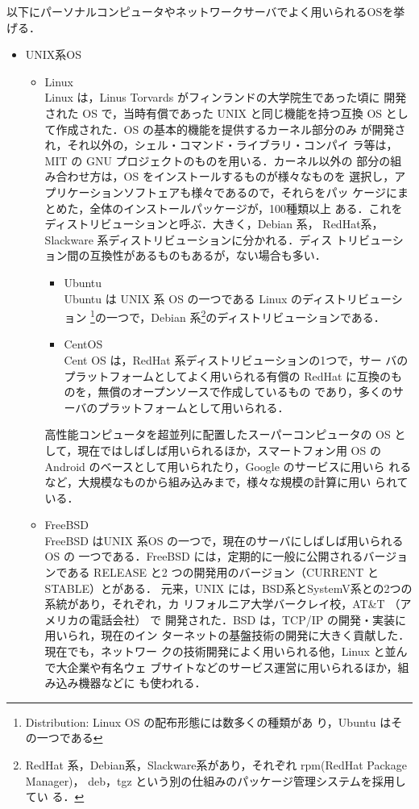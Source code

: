 以下にパーソナルコンピュータやネットワークサーバでよく用いられるOSを挙げる．
\begin{itemize}
  \item UNIX系OS
  \begin{itemize}
    \item Linux\\
	  Linux は，Linus Torvards がフィンランドの大学院生であった頃に
	  開発された OS で，当時有償であった UNIX と同じ機能を持つ互換
	  OS として作成された．OS の基本的機能を提供するカーネル部分のみ
	  が開発され，それ以外の，シェル・コマンド・ライブラリ・コンパイ
	  ラ等は，MIT の GNU プロジェクトのものを用いる．カーネル以外の
	  部分の組み合わせ方は，OS をインストールするものが様々なものを
	  選択し，アプリケーションソフトェアも様々であるので，それらをパッ
	  ケージにまとめた，全体のインストールパッケージが，100種類以上
	  ある．これをディストリビューションと呼ぶ．大きく，Debian 系，
	  RedHat系，Slackware 系ディストリビューションに分かれる．ディス
	  トリビューション間の互換性があるものもあるが，ない場合も多い．
	  \begin{itemize}
	   \item Ubuntu\\
		 Ubuntu は UNIX 系 OS の一つである Linux のディストリビューション
		 \footnote{Distribution: Linux OS の配布形態には数多くの種類があ
		 り，Ubuntu はその一つである}の一つで，Debian 系\footnote{RedHat
		 系，Debian系，Slackware系があり，それぞれ rpm(RedHat Package Manager)，
		 deb，tgz という別の仕組みのパッケージ管理システムを採用してい
		 る．}のディストリビューションである．
	   \item CentOS\\
		 Cent OS は，RedHat 系ディストリビューションの1つで，サー
		 バのプラットフォームとしてよく用いられる有償の RedHat
		 に互換のものを，無償のオープンソースで作成しているもの
		 であり，多くのサーバのプラットフォームとして用いられる．
	  \end{itemize}
	  高性能コンピュータを超並列に配置したスーパーコンピュータの OS
	  として，現在ではしばしば用いられるほか，スマートフォン用 OS の
	  Android のベースとして用いられたり，Google のサービスに用いら
	  れるなど，大規模なものから組み込みまで，様々な規模の計算に用い
	  られている．

    \item FreeBSD\\
      FreeBSD はUNIX 系OS の一つで，現在のサーバにしばしば用いられるOS の
      一つである．FreeBSD には，定期的に一般に公開されるバージョンである
      RELEASE と2 つの開発用のバージョン（CURRENT とSTABLE）とがある．
      元来，UNIX には，BSD系とSystemV系との2つの系統があり，それぞれ，カ
	  リフォルニア大学バークレイ校，AT\&T （アメリカの電話会社） で
	  開発された．BSD は，TCP/IP の開発・実装に用いられ，現在のイン
	  ターネットの基盤技術の開発に大きく貢献した．現在でも，ネットワー
	  クの技術開発によく用いられる他，Linux と並んで大企業や有名ウェ
	  ブサイトなどのサービス運営に用いられるほか，組み込み機器などに
	  も使われる．
  

\end{itemize}
\end{itemize}
